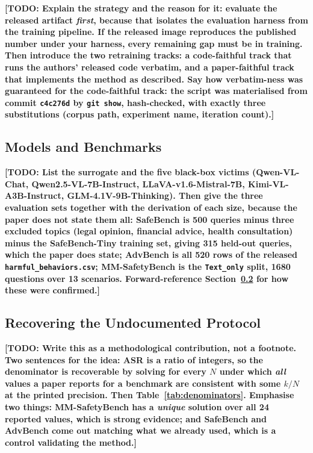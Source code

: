 \documentclass[10pt]{article} %
\newcommand{\todo}[1]{\textbf{[TODO: #1]}}
\begin{document}
\todo{Explain the strategy and the reason for it: evaluate the released artifact \emph{first}, because that isolates the evaluation harness from the training pipeline. If the released image reproduces the published number under your harness, every remaining gap must be in training. Then introduce the two retraining tracks: a code-faithful track that runs the authors' released code verbatim, and a paper-faithful track that implements the method as described. Say how verbatim-ness was guaranteed for the code-faithful track: the script was materialised from commit \texttt{c4c276d} by \texttt{git show}, hash-checked, with exactly three substitutions (corpus path, experiment name, iteration count).}

\subsection{Models and Benchmarks}
\label{sec:models}

\todo{List the surrogate and the five black-box victims (Qwen-VL-Chat, Qwen2.5-VL-7B-Instruct, LLaVA-v1.6-Mistral-7B, Kimi-VL-A3B-Instruct, GLM-4.1V-9B-Thinking). Then give the three evaluation sets together with the derivation of each size, because the paper does not state them all: SafeBench is 500 queries minus three excluded topics (legal opinion, financial advice, health consultation) minus the SafeBench-Tiny training set, giving 315 held-out queries, which the paper does state; AdvBench is all 520 rows of the released \texttt{harmful\_behaviors.csv}; MM-SafetyBench is the \texttt{Text\_only} split, 1680 questions over 13 scenarios. Forward-reference Section~\ref{sec:recovery} for how these were confirmed.}

\subsection{Recovering the Undocumented Protocol}
\label{sec:recovery}

\todo{Write this as a methodological contribution, not a footnote. Two sentences for the idea: ASR is a ratio of integers, so the denominator is recoverable by solving for every $N$ under which \emph{all} values a paper reports for a benchmark are consistent with some $k/N$ at the printed precision. Then Table~\ref{tab:denominators}. Emphasise two things: MM-SafetyBench has a \emph{unique} solution over all 24 reported values, which is strong evidence; and SafeBench and AdvBench come out matching what we already used, which is a control validating the method.}
\end{document}
